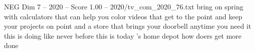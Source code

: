 \begin{textsample}{NEG Dim 7 – 2020 – Score 1.00 – 2020/tv\_com\_2020\_76.txt}  \label{ex:f7_neg_010}
bring on spring with calculators that can help you color videos that get to the point and keep your projects on point and a store that brings your doorbell anytime you need it this is doing like never before this is today 's home depot how doers get more done

\end{textsample}
